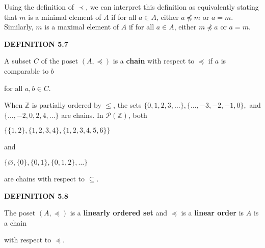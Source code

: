 \documentclass[12pt, a4paper]{article}
\begin{document}
\noindent Using the definition of $\prec$, we can interpret this definition as equivalently stating that $m$ is a minimal element of $A$ if for all $a\in A$, either $a\npreceq m$ or $a=m$. Similarly, $m$ is a maximal element of $A$ if for all $a\in A$, either $m\npreceq a$ or $a=m$.\par

\newpage

\noindent\blacksquare\textbf{ DEFINITION 5.7}\par

\vspace{4mm}

A subset $C$ of the poset $(A,\preceq)$ is a \textbf{chain} with respect to $\preceq$ if $a$ is comparable to $b$\par for all $a,b\in C$.\par

\vspace{4mm}

When $\mathbb{Z}$ is partially ordered by $\leq$, the sets $\{0,1,2,3,\ldots\},\{\ldots,-3,-2,-1,0\},$ and $\{\ldots,-2,0,2,4,\ldots\}$ are chains. In $\mathcal{P}(\mathbb{Z})$, both\par

\vspace{4mm}

\centerline{$\{\{1,2\},\{1,2,3,4\},\{1,2,3,4,5,6\}\}$}

\vspace{4mm}

\noindent and\par

\vspace{4mm}

\centerline{$\{\varnothing,\{0\},\{0,1\},\{0,1,2\},\ldots\}$}

\vspace{4mm}

\noindent are chains with respect to $\subseteq$.

\vspace{4mm}

\noindent\blacksquare\textbf{ DEFINITION 5.8}\par

\vspace{4mm}

The poset $(A,\preceq)$ is a \textbf{linearly ordered set} and $\preceq$ is a \textbf{linear order} is $A$ is a chain\par with respect to $\preceq$.\par
\end{document}
